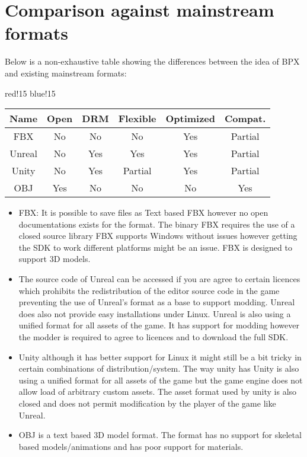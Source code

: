 \section{Comparison against mainstream formats}
Below is a non-exhaustive table showing the differences between the idea of BPX and existing mainstream formats:
\begin{center}
    {
        {red!15}
        {blue!15}
        \begin{tabular}{|c|c|c|c|c|c|}
            \hline
            \textbf{Name} & \textbf{Open} & \textbf{DRM} & \textbf{Flexible} & \textbf{Optimized} & \textbf{Compat.} \\
    
            \hline\hline
            FBX & No & No & No & Yes & Partial \\
            Unreal & No & Yes & Yes & Yes & Partial \\
            Unity & No & Yes & Partial & Yes & Partial \\
            OBJ & Yes & No & No & No & Yes \\
            \hline
        \end{tabular}
    }
\end{center}
\begin{itemize}
    \item FBX: It is possible to save files as Text based FBX however no open documentations exists for the format. The binary FBX requires the use of a closed source library FBX supports Windows without issues however getting the SDK to work different platforms might be an issue.\newline
    FBX is designed to support 3D models.
    \item The source code of Unreal can be accessed if you are agree to certain licences which prohibits the redistribution of the editor source code in the game preventing the use of Unreal's format as a base to support modding. Unreal does also not provide easy installations under Linux.\newline
    Unreal is also using a unified format for all assets of the game. It has support for modding however the modder is required to agree to licences and to download the full SDK.
    \item Unity although it has better support for Linux it might still be a bit tricky in certain combinations of distribution/system. The way unity has\newline
    Unity is also using a unified format for all assets of the game but the game engine does not allow load of arbitrary custom assets. The asset format used by unity is also closed and does not permit modification by the player of the game like Unreal.
    \item OBJ is a text based 3D model format. The format has no support for skeletal based models/animations and has poor support for materials.
\end{itemize}